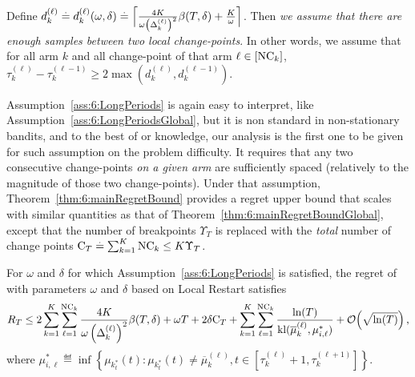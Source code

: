 \begin{assumption}\label{ass:6:LongPeriods}
\begin{leftbar}[assumptionbar]  %
    Define
    $d_k^{(\ell)} \overset{.}{=} d_k^{(\ell)}(\omega,\delta) \overset{.}{=} \Bigl\lceil \frac{4K}{\omega\left(\Delta_k^{(\ell)}\right)^2}\beta(T,\delta) + \frac{K}{\omega} \Bigr\rceil$.
    Then \emph{we assume that there are enough samples between two local change-points}.
    In other words, we assume that for all arm $k$ and all change-point of that arm $\ell \in [\text{NC}_k]$, $\tau_k^{(\ell)} - \tau_k^{(\ell-1)} \geq 2\max (d_k^{(\ell)},d_k^{(\ell-1)})$.
\end{leftbar}  %
\end{assumption}

Assumption~\ref{ass:6:LongPeriods} is again easy to interpret, like Assumption~\ref{ass:6:LongPeriodsGlobal}, but it is non standard in non-stationary bandits, and to the best of or knowledge, our analysis is the first one to be given for such assumption on the problem difficulty.
%
It requires that any two consecutive change-points \emph{on a given arm} are sufficiently spaced (relatively to the magnitude of those two change-points). Under that assumption, Theorem~\ref{thm:6:mainRegretBound} provides a regret upper bound that scales with similar quantities as that of Theorem~\ref{thm:6:mainRegretBoundGlobal}, except that the number of breakpoints $\Upsilon_T$ is replaced with the \emph{total} number of change points $\mathrm{C}_T \overset{.}{=} \sum_{k=1}^K \text{NC}_k \leq K \Upsilon_T$.

\begin{theorem}\label{thm:6:mainRegretBound}
\begin{leftbar}[theorembar]  %
    For $\omega$ and $\delta$ for which Assumption~\ref{ass:6:LongPeriods} is satisfied, the regret of \GLRklUCB{} with parameters $\omega$ and $\delta$ based on Local Restart satisfies
    \begin{equation}
        R_T \leq 2\sum_{k=1}^K\sum_{\ell=1}^{\text{NC}_k} \frac{4K}{\omega \left(\Delta_k^{(\ell)}\right)^2}\beta(T,\delta) +\omega T + 2 \delta \mathrm{C}_T  + \sum_{k=1}^K\sum_{\ell=1}^{\text{NC}_k} \frac{\ln(T)}{\mathrm{kl}(\overline{\mu}_k^{(\ell)},{\mu}^*_{i,\ell})} +\mathop{}\mathopen{}\mathcal{O}\mathopen{}\left(\sqrt{\ln(T)}\right),
    \end{equation}
    where ${\mu}^*_{i,\ell} \eqdef \inf \left\{ \mu_{k_t^*}(t) : \mu_{k_t^*}(t) \neq \overline{\mu}_k^{(\ell)}, t \in [\tau_k^{(\ell)}+1, \tau_k^{(\ell+1)}]\right\}$.
\end{leftbar}  %
\end{theorem}

